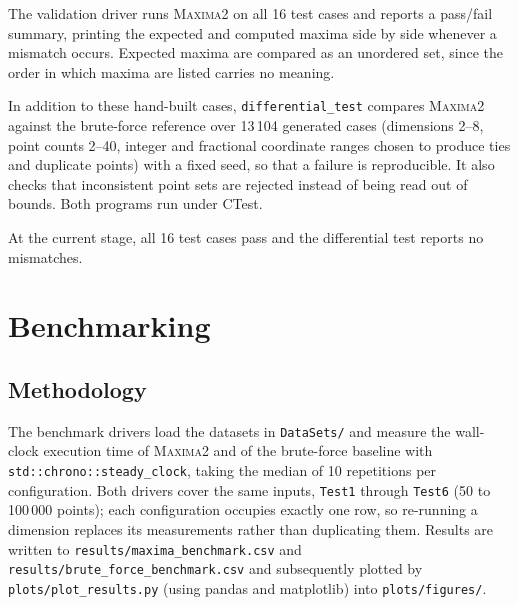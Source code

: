 \documentclass[11pt]{article}
\begin{document}


The validation driver runs \textsc{Maxima2} on all 16 test cases and
reports a pass/fail summary, printing the expected and computed maxima
side by side whenever a mismatch occurs. Expected maxima are compared as
an unordered set, since the order in which maxima are listed carries no
meaning.



\noindent In addition to these hand-built cases, \texttt{differential\_test}
compares \textsc{Maxima2} against the brute-force reference over 13\,104
generated cases (dimensions 2--8, point counts 2--40, integer and
fractional coordinate ranges chosen to produce ties and duplicate
points) with a fixed seed, so that a failure is reproducible. It also
checks that inconsistent point sets are rejected instead of being read
out of bounds. Both programs run under CTest.

\noindent At the current stage, all 16 test cases pass and the
differential test reports no mismatches.

\section{Benchmarking}

\subsection{Methodology}

The benchmark drivers load the datasets in \texttt{DataSets/} and measure
the wall-clock execution time of \textsc{Maxima2} and of the brute-force
baseline with \texttt{std::chrono::steady\_clock}, taking the median of 10
repetitions per configuration. Both drivers cover the same inputs,
\texttt{Test1} through \texttt{Test6} (50 to 100\,000 points); each
configuration occupies exactly one row, so re-running a dimension replaces
its measurements rather than duplicating them. Results are written to
\texttt{results/maxima\_benchmark.csv} and
\texttt{results/brute\_force\_benchmark.csv} and subsequently plotted by
\texttt{plots/plot\_results.py} (using pandas and matplotlib) into
\texttt{plots/figures/}.
\end{document}
